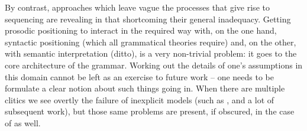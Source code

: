 \documentclass[output=paper,
modfonts
]{LSP/langsci}
\begin{document}
By contrast, approaches which leave vague the processes that give rise to  sequencing are revealing
in that shortcoming their general inadequacy. Getting prosodic positioning to interact in the required way with, on the one hand,
syntactic positioning (which all grammatical theories require) and, on the other, with semantic interpretation (ditto), is a very
non-trivial problem: it goes to the core architecture of the grammar. Working out the details of one's assumptions
in this domain cannot be left as an exercise to future work -- one needs to be formulate a clear notion about such
things going in. When there are multiple clitics we see overtly
the failure of inexplicit models (such as \citealt{hale1987}, and a lot of subsequent work), but those same problems are present,
if obscured, in the case of  as well.  


\printbibliography[heading=subbibliography,notkeyword=this]

\end{document}
